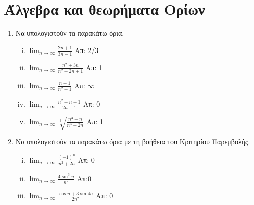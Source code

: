 \section*{Άλγεβρα και θεωρήματα Ορίων}

\begin{enumerate}

  \item Να υπολογιστούν τα παρακάτω όρια.
    \begin{enumerate}[i)]
      \item $ \lim_{n \to \infty} \frac{2n+1}{3n-1} $ \hfill Απ: 2/3 
      \item $ \lim_{n \to \infty} \frac{n^{2}+3n}{n^{2}+2n+1} $ \hfill Απ: 1 
      \item $ \lim_{n \to \infty} \frac{n+1}{n^{2}+1} $ \hfill Απ: $ \infty $ 
      \item $ \lim_{n \to \infty} \frac{n^2+n+1}{2n-1} $ \hfill Απ: $0$ 
      \item $ \lim_{n \to \infty} \sqrt[3]{\frac{n^{3}+n}{n^{3}+2n}} $ 
        \hfill Απ: 1 
    \end{enumerate}

  \item Να υπολογιστούν τα παρακάτω όρια με τη βοήθεια του Κριτηρίου 
    Παρεμβολής.

    \begin{enumerate}[i)]
      \item $ \lim_{n \to \infty} \frac{(-1)^{n}}{n^{2}+2n}  $ \hfill Απ: 0  
      \item $ \lim_{n \to \infty} \frac{4 \sin^{3}{n}}{n^{2}} $ 
        \hfill Απ:0
      \item $ \lim_{n \to \infty} \frac{\cos{n} + 3 \sin{4n}}{ 2 n^2} $ \hfill Απ: 0  
    \end{enumerate}
\end{enumerate}





